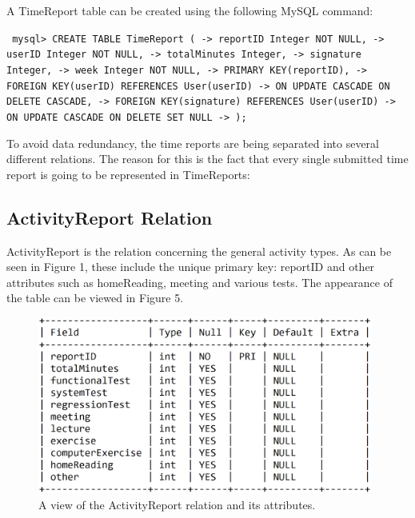 \documentclass{article}
\begin{document}
A TimeReport table can be created using the following MySQL command:
\newline

\small
\texttt{
\noindent mysql> CREATE TABLE TimeReport (\newline
\indent \indent \indent -> reportID Integer NOT NULL,\newline
\indent \indent \indent -> userID Integer NOT NULL,\newline
\indent \indent \indent -> totalMinutes Integer,\newline
\indent \indent \indent -> signature Integer,\newline
\indent \indent \indent -> week Integer NOT NULL,\newline
\indent \indent \indent -> PRIMARY KEY(reportID),\newline
\indent \indent \indent -> FOREIGN KEY(userID) REFERENCES User(userID)\newline
\indent \indent \indent -> ON UPDATE CASCADE ON DELETE CASCADE,\newline
\indent \indent \indent -> FOREIGN KEY(signature) REFERENCES User(userID)\newline
\indent \indent \indent -> ON UPDATE CASCADE ON DELETE SET NULL\newline
\indent \indent \indent -> );
}
\normalsize
\newline

To avoid data redundancy, the time reports are being separated into several different relations. The reason for this is the fact that every single submitted time report is going to be represented in TimeReports:

\subsection{ActivityReport Relation}
ActivityReport is the relation concerning the general activity types. As can be seen in Figure 1, these include the unique primary key: reportID and other attributes such as homeReading, meeting and various tests. The appearance of the table can be viewed in Figure 5.
\newline

\begin{figure}[H]
     \centering
     \includegraphics[width=11cm]{images/SQL_tables/activityreport.png}
     \renewcommand\figurename{Figure}
     \caption{A view of the ActivityReport relation and its attributes.}
     \label{fig:my_label}
 \end{figure}
\newline
\end{document}
